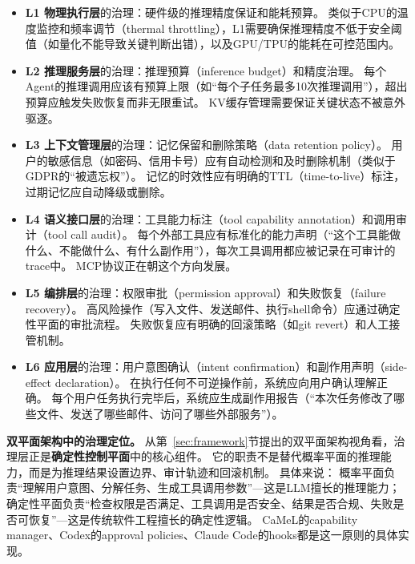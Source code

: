 \begin{itemize}[nosep]
\item \textbf{L1 物理执行层}的治理：硬件级的推理精度保证和能耗预算。
类似于CPU的温度监控和频率调节（thermal throttling），L1需要确保推理精度不低于安全阈值（如量化不能导致关键判断出错），以及GPU/TPU的能耗在可控范围内。

\item \textbf{L2 推理服务层}的治理：推理预算（inference budget）和精度治理。
每个Agent的推理调用应该有预算上限（如``每个子任务最多10次推理调用''），超出预算应触发失败恢复而非无限重试。
KV缓存管理需要保证关键状态不被意外驱逐。

\item \textbf{L3 上下文管理层}的治理：记忆保留和删除策略（data retention policy）。
用户的敏感信息（如密码、信用卡号）应有自动检测和及时删除机制（类似于GDPR的``被遗忘权''）。
记忆的时效性应有明确的TTL（time-to-live）标注，过期记忆应自动降级或删除。

\item \textbf{L4 语义接口层}的治理：工具能力标注（tool capability annotation）和调用审计（tool call audit）。
每个外部工具应有标准化的能力声明（``这个工具能做什么、不能做什么、有什么副作用''），每次工具调用都应被记录在可审计的trace中。
MCP协议\cite{mcp_intro_2026}正在朝这个方向发展。

\item \textbf{L5 编排层}的治理：权限审批（permission approval）和失败恢复（failure recovery）。
高风险操作（写入文件、发送邮件、执行shell命令）应通过确定性平面的审批流程。
失败恢复应有明确的回滚策略（如git revert）和人工接管机制。

\item \textbf{L6 应用层}的治理：用户意图确认（intent confirmation）和副作用声明（side-effect declaration）。
在执行任何不可逆操作前，系统应向用户确认理解正确。
每个用户任务执行完毕后，系统应生成副作用报告（``本次任务修改了哪些文件、发送了哪些邮件、访问了哪些外部服务''）。
\end{itemize}

\textbf{双平面架构中的治理定位。}
从第~\ref{sec:framework}节提出的双平面架构视角看，治理层正是\textbf{确定性控制平面}中的核心组件。
它的职责不是替代概率平面的推理能力，而是为推理结果设置边界、审计轨迹和回滚机制。
具体来说：
概率平面负责``理解用户意图、分解任务、生成工具调用参数''---这是LLM擅长的推理能力；
确定性平面负责``检查权限是否满足、工具调用是否安全、结果是否合规、失败是否可恢复''---这是传统软件工程擅长的确定性逻辑。
CaMeL\cite{debenedetti2025camel}的capability manager、Codex\cite{openai_codex_approvals_2026}的approval policies、Claude Code\cite{anthropic_claudecode_security_2026}的hooks都是这一原则的具体实现。

